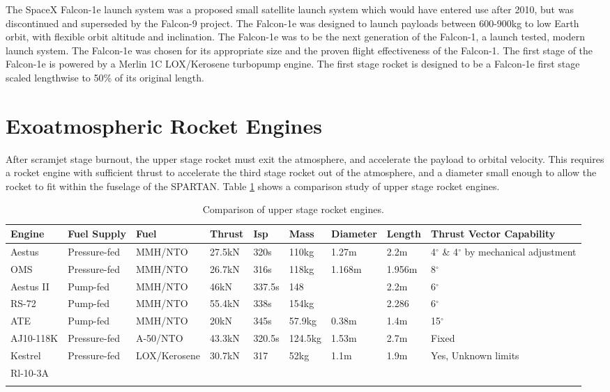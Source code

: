 The SpaceX Falcon-1e launch system was a proposed small satellite launch system which would have entered use after 2010\cite{Vehicle2008}, but was discontinued and superseded by the Falcon-9 project. The Falcon-1e was designed to launch payloads between 600-900kg to low Earth orbit, with flexible orbit altitude and inclination. The Falcon-1e was to be the next generation of the Falcon-1\cite{Vehicle2008}, a launch tested, modern launch system. The Falcon-1e was chosen for its appropriate size and the proven flight effectiveness of the Falcon-1. The first stage of the Falcon-1e is powered by a Merlin 1C LOX/Kerosene turbopump engine. The first stage rocket is designed to be a Falcon-1e first stage scaled lengthwise to 50\% of its original length. 


\section{Exoatmospheric Rocket Engines}
After scramjet stage burnout, the upper stage rocket must exit the atmosphere, and accelerate the payload to orbital velocity. This requires a rocket engine with sufficient thrust to accelerate the third stage rocket out of the atmosphere, and a diameter small enough to allow the rocket to fit within the fuselage of the SPARTAN. Table \ref{tab:Engine} shows a comparison study of upper stage rocket engines. 

\begin{landscape}%
\begin{table}

\begin{tabularx}{\linewidth}{|X|X|X|X|X|X|X|X|X|}

	\hline Engine & Fuel Supply & Fuel & Thrust & Isp & Mass & Diameter & Length & Thrust Vector Capability \\ 
	\hline Aestus & Pressure-fed & MMH/NTO & 27.5kN & 320s & 110kg & 1.27m & 2.2m & 4$^\circ$ \& 4$^\circ$ by mechanical adjustment\\ 
	\hline OMS & Pressure-fed  & MMH/NTO & 26.7kN & 316s & 118kg & 1.168m & 1.956m & 8$^\circ$\\ 
	\hline Aestus II & Pump-fed & MMH/NTO & 46kN & 337.5s & 148 &  & 2.2m  & 6$^\circ$\\ 
	\hline RS-72 & Pump-fed & MMH/NTO & 55.4kN & 338s & 154kg &  & 2.286 &  6$^\circ$\\ 
	\hline ATE & Pump-fed & MMH/NTO & 20kN & 345s & 57.9kg & 0.38m & 1.4m &  15$^\circ$\\ 
	\hline AJ10-118K & Pressure-fed & A-50/NTO & 43.3kN & 320.5s & 124.5kg & 1.53m & 2.7m & Fixed \\ 
	\hline Kestrel & Pressure-fed & LOX/Kerosene & 30.7kN & 317 & 52kg & 1.1m & 1.9m  & Yes, Unknown limits\\ 
	\hline Rl-10-3A &  &  &  &  &  &  &   &\\ 
	\hline  &  &  &  &  &  &  &  & \\ 
	\hline 
\end{tabularx} 
\caption {Comparison of upper stage rocket engines.} 
\label{tab:Engine}
\end{table}
\end{landscape}


